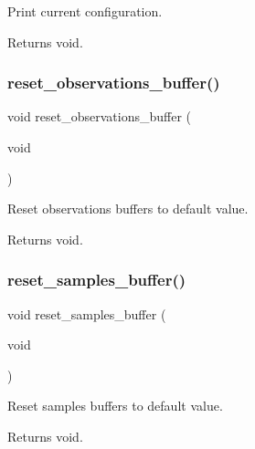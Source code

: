 Print current configuration. 

\begin{DoxyReturn}{Returns}
void. 
\end{DoxyReturn}
\mbox{\label{i2c-th_8ino_adfc6b4ac31f79cb1c99dd2409f05f32d}} 
\subsubsection{\texorpdfstring{reset\+\_\+observations\+\_\+buffer()}{reset\_observations\_buffer()}}
{\footnotesize\ttfamily void reset\+\_\+observations\+\_\+buffer (\begin{DoxyParamCaption}\item[{void}]{ }\end{DoxyParamCaption})}



Reset observations buffers to default value. 

\begin{DoxyReturn}{Returns}
void. 
\end{DoxyReturn}
\mbox{\label{i2c-th_8ino_ae176339df7451dc03037f319710575aa}} 
\subsubsection{\texorpdfstring{reset\+\_\+samples\+\_\+buffer()}{reset\_samples\_buffer()}}
{\footnotesize\ttfamily void reset\+\_\+samples\+\_\+buffer (\begin{DoxyParamCaption}\item[{void}]{ }\end{DoxyParamCaption})}



Reset samples buffers to default value. 

\begin{DoxyReturn}{Returns}
void. 
\end{DoxyReturn}
\mbox{\label{i2c-th_8ino_aba0fc91d6c2829df00a9d5fe2b921c90}} 
